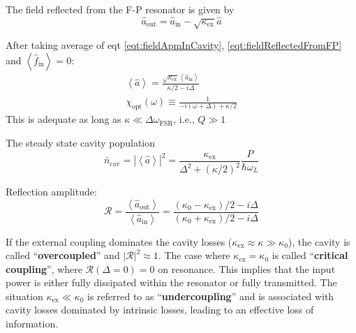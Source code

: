 \documentclass[8pt,a4paper,twocolumn]{article} %
\numberwithin{equation}{section} %
\begin{document}
			The field reflected from the F-P resonator is given by
			\begin{equation}
			\label{eqt:fieldReflectedFromFP}
				\hat{a}_{\text{out}}=\hat{a}_{\text{in}}-\sqrt{\kappa_{\text{ex}}} \hat{a}
			\end{equation}

			After taking average of eqt \ref{eqt:fieldApmInCavity}, \ref{eqt:fieldReflectedFromFP} and $ \left<\hat{f}_{\text{in}} \right> =0$:
			\begin{gather}
				\left<\hat{a} \right>= \frac{ \sqrt{\kappa_{\text{ex}}} \left< \hat{a}_{\text{in}} \right>}{\kappa/2-i \Delta}\\
				\chi_{\text{opt}}(\omega)\equiv \frac{1}{-i(\omega+\Delta)+\kappa/2 }
			\end{gather}
			This is adequate as long as $ \kappa \ll \Delta \omega_{\text{FSR}} $, i.e., $Q\gg1$

			The steady state cavity population
			\begin{equation}
				\bar{n}_{\text{cav}}=\left| \left< \hat{a} \right> \right|^2 = \frac{\kappa_{\text{ex}}}{\Delta^2+(\kappa/2)^2} \frac{P}{\hbar \omega_L}
			\end{equation}

			Reflection amplitude:
			\begin{equation}
				\mathcal{R}=\frac{\left< \hat{a}_{\text{out}} \right>}{\left< \hat{a}_{\text{in}} \right>}=\frac{(\kappa_0- \kappa_{\text{ex}}  )/2-i \Delta}{(\kappa_0+ \kappa_{\text{ex}}  )/2-i \Delta}
			\end{equation}

			If the external coupling dominates the cavity losses ($ \kappa_{\text{ex}}\approx \kappa\gg \kappa_0 $), the cavity is called ``\textbf{overcoupled}'' and $ \left|\mathcal{R}\right|^2 \approx 1$. The case where $ \kappa_{\text{ex}}=\kappa_0  $ is called ``\textbf{critical coupling}'', where $\mathcal{R}(\Delta=0)=0 $ on resonance. This implies that the input power is either fully dissipated within the resonator or fully transmitted. The situation $ \kappa_{\text{ex}} \ll \kappa_0  $ is referred to as ``\textbf{undercoupling}'' and is associated with cavity losses dominated by intrinsic losses, leading to an effective loss of information.


\end{document}
